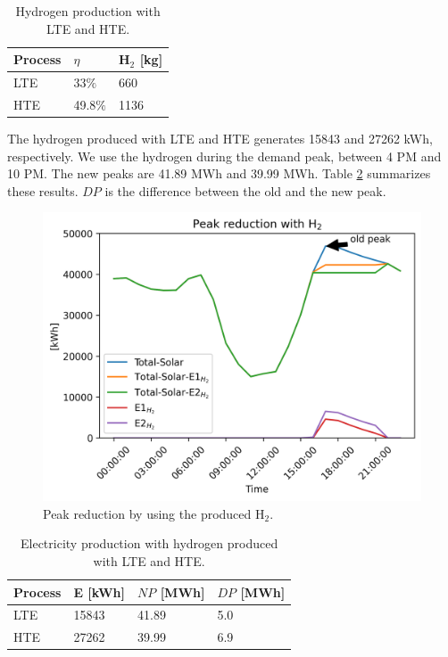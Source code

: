 \documentclass{anstrans}
\begin{document}
\begin{table}[htbp!]
    \begin{tabular}{|lll|}
        \hline
        Process &  $\eta$ &  H$_2$ [kg]  \\ \hline
        \gls{LTE} &  33$\%$  &  660  \\ 
        \gls{HTE} &  49.8$\%$  &  1136  \\ \hline
    \end{tabular}
    \caption{Hydrogen production with \gls{LTE} and \gls{HTE}.}
    \label{tab:hydro}
\end{table}

The hydrogen produced with \gls{LTE} and \gls{HTE} generates 15843 and 27262 kWh, respectively. We use the hydrogen during the demand peak, between 4 PM and 10 PM. The new peaks are 41.89 MWh and 39.99 MWh.
Table \ref{tab:elect} summarizes these results. $DP$ is the difference between the old and the new peak.

\begin{figure}[htbp!]
	\centering
	\includegraphics[width=1.0\linewidth]{figures/uiuc-hydro3.png}
	\hfill
	\caption{Peak reduction by using the produced H$_2$.}
	\label{fig:uiuc-hydro3}
\end{figure}

\begin{table}[htbp!]
    \begin{tabular}{|llll|}
        \hline
        Process & E [kWh] & $NP$ [MWh] & $DP$ [MWh] \\ \hline
        \gls{LTE} & 15843 & 41.89 & 5.0 \\
        \gls{HTE} & 27262 & 39.99 & 6.9 \\ \hline
    \end{tabular}
    \caption{Electricity production with hydrogen produced with \gls{LTE} and \gls{HTE}.}
    \label{tab:elect}
\end{table}
\end{document}
